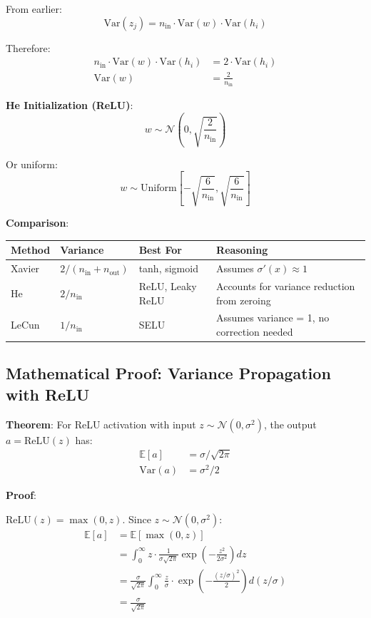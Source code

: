 \documentclass[11pt,oneside]{book}
\begin{document}
From earlier:
\[
\text{Var}(z_j) = n_{\text{in}} \cdot \text{Var}(w) \cdot \text{Var}(h_i)
\]

Therefore:
\begin{align*}
n_{\text{in}} \cdot \text{Var}(w) \cdot \text{Var}(h_i) &= 2 \cdot \text{Var}(h_i) \\
\text{Var}(w) &= \frac{2}{n_{\text{in}}}
\end{align*}

\textbf{He Initialization (ReLU)}:
\[
w \sim \mathcal{N}\left(0, \sqrt{\frac{2}{n_{\text{in}}}}\right)
\]

Or uniform:
\[
w \sim \text{Uniform}\left[-\sqrt{\frac{6}{n_{\text{in}}}}, \sqrt{\frac{6}{n_{\text{in}}}}\right]
\]

\textbf{Comparison}:

\begin{table}[h]
\centering
\begin{tabular}{llll}
\toprule
\textbf{Method} & \textbf{Variance} & \textbf{Best For} & \textbf{Reasoning} \\
\midrule
Xavier & $2/(n_{\text{in}} + n_{\text{out}})$ & tanh, sigmoid & Assumes $\sigma'(x) \approx 1$ \\
He & $2/n_{\text{in}}$ & ReLU, Leaky ReLU & Accounts for variance reduction from zeroing \\
LeCun & $1/n_{\text{in}}$ & SELU & Assumes variance = 1, no correction needed \\
\bottomrule
\end{tabular}
\end{table}

\subsection{Mathematical Proof: Variance Propagation with ReLU}

\textbf{Theorem}: For ReLU activation with input $z \sim \mathcal{N}(0, \sigma^2)$, the output $a = \text{ReLU}(z)$ has:
\begin{align*}
\mathbb{E}[a] &= \sigma/\sqrt{2\pi} \\
\text{Var}(a) &= \sigma^2/2
\end{align*}

\textbf{Proof}:

$\text{ReLU}(z) = \max(0, z)$. Since $z \sim \mathcal{N}(0, \sigma^2)$:
\begin{align*}
\mathbb{E}[a] &= \mathbb{E}[\max(0, z)] \\
&= \int_0^\infty z \cdot \frac{1}{\sigma\sqrt{2\pi}} \exp\left(-\frac{z^2}{2\sigma^2}\right) dz \\
&= \frac{\sigma}{\sqrt{2\pi}} \int_0^\infty \frac{z}{\sigma} \cdot \exp\left(-\frac{(z/\sigma)^2}{2}\right) d(z/\sigma) \\
&= \frac{\sigma}{\sqrt{2\pi}}
\end{align*}
\end{document}
